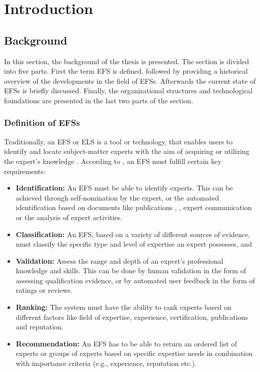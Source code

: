 \newpage
\section{Introduction}

\subsection{Background}
In this section, the background of the thesis is presented. The section is divided into five parts. First the term \acf{EFS} is defined, followed by providing a historical overview of the developments in the field of \acp{EFS}. Afterwards the current state of \acp{EFS} is briefly discussed. Finally, the organizational structures and technological foundations are presented in the last two parts of the section.


\subsubsection{Definition of \aclp{EFS}}
Traditionally, an \acf{EFS} or \ac{ELS} is a tool or technology, that enables users to identify and locate subject-matter experts with the aim of acquiring or utilizing the expert’s knowledge \parencite[1]{maybury_expert_2006}. According to \textcite[vii, 3]{maybury_expert_2006}, an \ac{EFS} must fulfill certain key requirements:

\begin{itemize}
    \item \textbf{Identification:} An \ac{EFS} must be able to identify experts. This can be achieved through self-nomination by the expert, or the automated identification based on documents like publications \parencite[vii, 3]{maybury_expert_2006}, \parencite[3]{stankovic_looking_2010}, expert communication or the analysis of expert activities. 
    \item \textbf{Classification:} An \ac{EFS}, based on a variety of different sources of evidence, must classify the specific type and level of expertise an expert possesses, and 
    \item \textbf{Validation:} Assess the range and depth of an expert’s professional knowledge and skills. This can be done by human validation in the form of assessing qualification evidence, or by automated user feedback in the form of ratings or reviews. 
    \item \textbf{Ranking:} The system must have the ability to rank experts based on different factors like field of expertise, experience, certification, publications and reputation.
    \item \textbf{Recommendation:} An \ac{EFS} has to be able to return an ordered list of experts or groups of experts based on specific expertise needs in combination with importance criteria (e.g., experience, reputation etc.).
\end{itemize}

